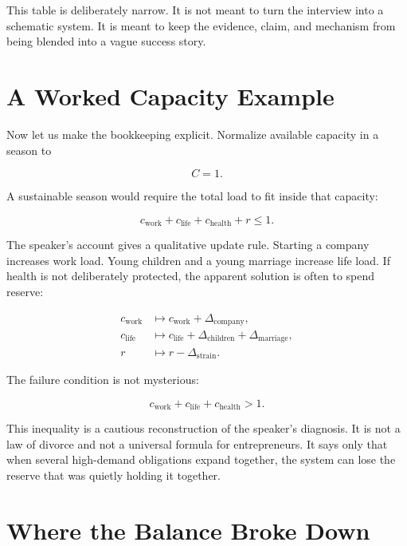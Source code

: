 This table is deliberately narrow. It is not meant to turn the interview into a schematic system. It is meant to keep the evidence, claim, and mechanism from being blended into a vague success story.

\section{A Worked Capacity Example}

Now let us make the bookkeeping explicit. Normalize available capacity in a season to

\begin{equation}
C=1.
\end{equation}

A sustainable season would require the total load to fit inside that capacity:

\begin{equation}
c_{\text{work}}+c_{\text{life}}+c_{\text{health}}+r \leq 1.
\end{equation}

The speaker's account gives a qualitative update rule. Starting a company increases work load. Young children and a young marriage increase life load. If health is not deliberately protected, the apparent solution is often to spend reserve:

\begin{align}
c_{\text{work}} &\longmapsto c_{\text{work}}+\Delta_{\text{company}},\\
c_{\text{life}} &\longmapsto c_{\text{life}}+\Delta_{\text{children}}+\Delta_{\text{marriage}},\\
r &\longmapsto r-\Delta_{\text{strain}}.
\end{align}

The failure condition is not mysterious:

\begin{equation}
c_{\text{work}}+c_{\text{life}}+c_{\text{health}} > 1.
\end{equation}

This inequality is a cautious reconstruction of the speaker's diagnosis. It is not a law of divorce and not a universal formula for entrepreneurs. It says only that when several high-demand obligations expand together, the system can lose the reserve that was quietly holding it together.

\section{Where the Balance Broke Down}

